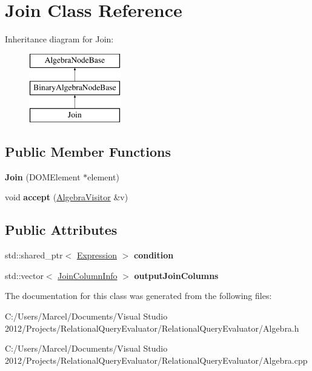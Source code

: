 \hypertarget{class_join}{\section{Join Class Reference}
\label{class_join}
}
Inheritance diagram for Join\+:\begin{figure}[H]
\begin{center}
\leavevmode
\includegraphics[height=3.000000cm]{class_join}
\end{center}
\end{figure}
\subsection*{Public Member Functions}
\begin{DoxyCompactItemize}
\item 
\hypertarget{class_join_ac9d8f69a2f72ce85df3e581292c46fc0}{{\bfseries Join} (D\+O\+M\+Element $\ast$element)}\label{class_join_ac9d8f69a2f72ce85df3e581292c46fc0}

\item 
\hypertarget{class_join_a387b23cf52fa9dc5390f003bcc051cc1}{void {\bfseries accept} (\hyperlink{class_algebra_visitor}{Algebra\+Visitor} \&v)}\label{class_join_a387b23cf52fa9dc5390f003bcc051cc1}

\end{DoxyCompactItemize}
\subsection*{Public Attributes}
\begin{DoxyCompactItemize}
\item 
\hypertarget{class_join_aa1374c434547d1a0a478a914ac0445bb}{std\+::shared\+\_\+ptr$<$ \hyperlink{class_expression}{Expression} $>$ {\bfseries condition}}\label{class_join_aa1374c434547d1a0a478a914ac0445bb}

\item 
\hypertarget{class_join_ad0fbf6166d055f84e2a1e9ec5af9824a}{std\+::vector$<$ \hyperlink{class_join_column_info}{Join\+Column\+Info} $>$ {\bfseries output\+Join\+Columns}}\label{class_join_ad0fbf6166d055f84e2a1e9ec5af9824a}

\end{DoxyCompactItemize}


The documentation for this class was generated from the following files\+:\begin{DoxyCompactItemize}
\item 
C\+:/\+Users/\+Marcel/\+Documents/\+Visual Studio 2012/\+Projects/\+Relational\+Query\+Evaluator/\+Relational\+Query\+Evaluator/Algebra.\+h\item 
C\+:/\+Users/\+Marcel/\+Documents/\+Visual Studio 2012/\+Projects/\+Relational\+Query\+Evaluator/\+Relational\+Query\+Evaluator/Algebra.\+cpp\end{DoxyCompactItemize}
